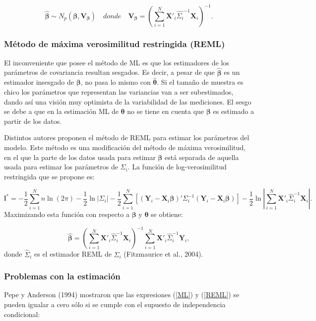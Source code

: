 \documentclass[spanish]{article}
\numberwithin{figure}{subsection}
\numberwithin{equation}{subsection}
\numberwithin{table}{subsection}
\begin{document}
\[ \hat{\bm{\beta}} \sim N_p(\bm{\beta}, \bm{V}_{\bm{\beta}}) \quad donde \quad \bm{V}_{\bm{\beta}} =
(\sum_{i=1}^{N} \bm{X}'_i\hat{\bm{\varSigma}_i}^{-1}\bm{X}_i)^{-1}. \]

\subsubsection{Método de máxima verosimilitud restringida (REML)}

El inconveniente que posee el método de ML es que los estimadores de los
parámetros de covariancia resultan sesgados. Es decir, a pesar de que
$\bm{\hat{\beta}}$ es un estimador insesgado de $\bm{\beta}$, no pasa lo mismo
con $\bm{\hat{\theta}}$. Si el tamaño de muestra es chico los parámetros que
representan las variancias van a ser subestimados, dando así una visión muy
optimista de la variabilidad de las mediciones. El sesgo se debe a que en la
estimación ML de $\bm{\theta}$ no se tiene en cuenta que $\bm{\beta}$ es
estimado a partir de los datos.

Distintos autores proponen el método de REML para estimar los parámetros del
modelo. Este método es una modificación del método de máxima verosimilitud, en
el que la parte de los datos usada para estimar $\bm{\beta}$ está separada de
aquella usada para estimar los parámetros de $\bm{\varSigma}_i$. La función de
log-verosimilitud restringida que se propone es:

\begin{equation}
\label{REML}
	\bm{l}^* = -\frac{1}{2} \sum_{i=1}^{N}n \ln(2\pi) - \frac{1}{2}\ln|\bm{\varSigma}_i| -
	\frac{1}{2} \sum_{i=1}^{N} [(\bm{Y}_i - \bm{X}_i\bm{\beta})'
	\bm{\varSigma}_i^{-1} (\bm{Y}_i - \bm{X}_i\bm{\beta})]
	- \frac{1}{2} \ln |\sum_{i=1}^{N} \bm{X}'_i \hat{\bm{\varSigma}}_i^{-1} \bm{X}_i|.
\end{equation}
Maximizando esta función con respecto a $\bm{\beta}$ y $\bm{\theta}$ se obtiene:

\[ \hat{\bm{\beta}} = (\sum_{i=1}^{N} \bm{X}'_i \hat{\bm{\varSigma}}_i^{-1} \bm{X}_i)^{-1}
\sum_{i=1}^{N} \bm{X}'_i \hat{\bm{\varSigma}}_i^{-1} \bm{Y}_i, \]
donde $\hat{\bm{\varSigma}}_i$ es el estimador REML de ${\bm{\varSigma}_i}$ (Fitzmaurice et al., 2004).

\subsubsection{Problemas con la estimación}

Pepe y Anderson (1994) mostraron que las expresiones (\ref{ML}) y (\ref{REML})
se pueden igualar a cero sólo si se cumple con el supuesto de independencia
condicional:
\end{document}
